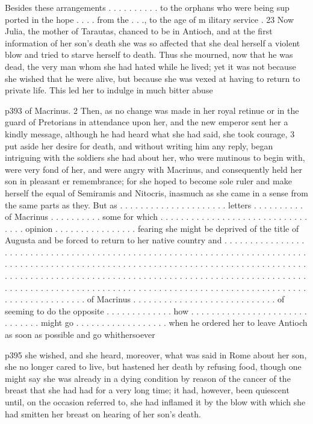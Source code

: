 Besides these arrangements . . . . . . . . . . to the orphans who were being sup ported in the hope . . . . from the . . ., to the age of m ilitary service . 23
Now Julia, the mother of Tarautas, chanced to be in Antioch, and at the first information of her son's death she was so affected that she deal herself a violent blow and tried to starve herself to death. Thus she mourned, now that he was dead, the very man whom she had hated while he lived; yet it was not because she wished that he were alive, but because she was vexed at having to return to private life. This led her to indulge in much bitter abuse

p393 of Macrinus. 2 Then, as no change was made in her royal retinue or in the guard of Pretorians in attendance upon her, and the new emperor sent her a kindly message, although he had heard what she had said, she took courage, 3 put aside her desire for death, and without writing him any reply, began intriguing with the soldiers she had about her, who were mutinous to begin with, were very fond of her, and were angry with Macrinus, and consequently held her son in pleasant er remembrance; for she hoped to become sole ruler and make herself the equal of Semiramis and Nitocris, inasmuch as she came in a sense from the same parts as they. But as . . . . . . . . . . . . . . . . . . . . . letters . . . . . . . . . . of Macrinus . . . . . . . . . . some for which . . . . . . . . . . . . . . . . . . . . . . . . . . . . . . . . . opinion . . . . . . . . . . . . . . . . fearing she might be deprived of the title of Augusta and be forced to return to her native country and . . . . . . . . . . . . . . . . . . . . . . . . . . . . . . . . . . . . . . . . . . . . . . . . . . . . . . . . . . . . . . . . . . . . . . . . . . . . . . . . . . . . . . . . . . . . . . . . . . . . . . . . . . . . . . . . . . . . . . . . . . . . . . . . . . . . . . . . . . . . . . . . . . . . . . . . . . . . . . . . . . . . . . . . . . . . . . . . . . . . . . . . . . . . . . . . . . . . . . . . . . . . . . . . . . . . . . . . . . . . . . . . . . . . . . . . . . . . . . . . . . . . . . . . . . . . . . . . . . . . . . . . . . . . of Macrinus . . . . . . . . . . . . . . . . . . . . . . . . . . . . of seeming to do the opposite . . . . . . . . . . . . . how . . . . . . . . . . . . . . . . . . . . . . . . . . . . . . might go . . . . . . . . . . . . . . . . . . when he ordered her to leave Antioch as soon as possible and go whithersoever

p395 she wished, and she heard, moreover, what was said in Rome about her son, she no longer cared to live, but hastened her death by refusing food, though one might say she was already in a dying condition by reason of the cancer of the breast that she had had for a very long time; it had, however, been quiescent until, on the occasion referred to, she had inflamed it by the blow with which she had smitten her breast on hearing of her son's death.

